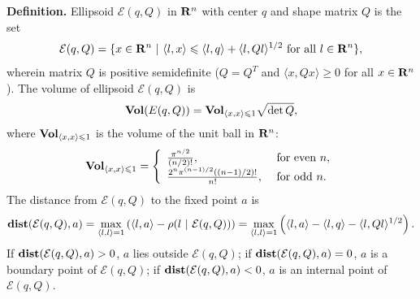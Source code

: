 \documentclass[letterpaper,10pt,english]{sphinxmanual}
\begin{document}
\textbf{Definition.} Ellipsoid ${\mathcal E}(q,Q)$ in ${\bf R}^n$ with center
$q$ and shape matrix $Q$ is the set
\label{chap_ellcalc:equation-ellipsoid2}\begin{gather}
\begin{split}{\mathcal E}(q,Q) = \{ x \in {\bf R}^n ~|~
\langle l,x\rangle\leqslant\langle l,q\rangle + \langle l,Ql\rangle^{1/2}
\mbox{ for all } l\in{\bf R}^n \},\end{split}\label{chap_ellcalc-ellipsoid2}
\end{gather}
wherein matrix $Q$ is positive semidefinite ($Q=Q^T$ and
$\langle x, Qx\rangle\geqslant0$ for all $x\in{\bf R}^n$).
The volume of ellipsoid ${\mathcal E}(q,Q)$ is
\label{chap_ellcalc:equation-ellvolume}\begin{gather}
\begin{split}{\bf Vol}(E(q,Q)) = {\bf Vol}_{\langle x,x\rangle\leqslant1}\sqrt{\det Q},\end{split}\label{chap_ellcalc-ellvolume}
\end{gather}
where ${\bf Vol}_{\langle x,x\rangle\leqslant1}$ is the volume of
the unit ball in ${\bf R}^n$:
\label{chap_ellcalc:equation-ellunitball}\begin{gather}
\begin{split}{\bf Vol}_{\langle x,x\rangle\leqslant1} = \left\{\begin{array}{ll}
\frac{\pi^{n/2}}{(n/2)!}, &
\mbox{ for even } n,\\
\frac{2^n\pi^{(n-1)/2}\left((n-1)/2\right)!}{n!}, &
\mbox{ for odd } n. \end{array}\right.\end{split}\label{chap_ellcalc-ellunitball}
\end{gather}
The distance from ${\mathcal E}(q,Q)$ to the fixed point $a$
is
\label{chap_ellcalc:equation-dist_point}\begin{gather}
\begin{split}{\bf dist}({\mathcal E}(q,Q),a) = \max_{\langle l,l\rangle=1}\left(\langle l,a\rangle -
\rho(l ~|~ {\mathcal E}(q,Q)) \right) =
\max_{\langle l,l\rangle=1}\left(\langle l,a\rangle - \langle l,q\rangle -
\langle l,Ql\rangle^{1/2}\right).\end{split}\label{chap_ellcalc-dist_point}
\end{gather}
If ${\bf dist}({\mathcal E}(q,Q),a) > 0$, $a$ lies outside
${\mathcal E}(q,Q)$; if
${\bf dist}({\mathcal E}(q,Q),a) = 0$, $a$ is a boundary
point of ${\mathcal E}(q,Q)$; if
${\bf dist}({\mathcal E}(q,Q),a) < 0$, $a$ is an internal
point of ${\mathcal E}(q,Q)$.
\end{document}
